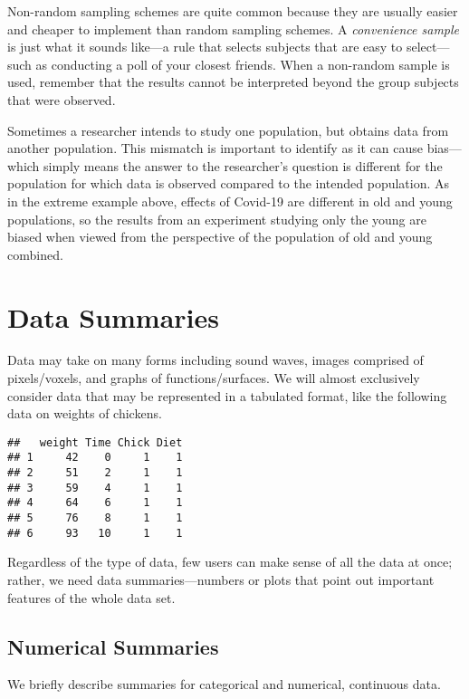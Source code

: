 \documentclass[
]{book}
\theoremstyle{definition}
\theoremstyle{definition}
\theoremstyle{definition}
\theoremstyle{definition}
\theoremstyle{remark}
\begin{document}
Non-random sampling schemes are quite common because they are usually easier and cheaper to implement than random sampling schemes. A \emph{convenience sample} is just what it sounds like---a rule that selects subjects that are easy to select---such as conducting a poll of your closest friends. When a non-random sample is used, remember that the results cannot be interpreted beyond the group subjects that were observed.

Sometimes a researcher intends to study one population, but obtains data from another population. This mismatch is important to identify as it can cause bias---which simply means the answer to the researcher's question is different for the population for which data is observed compared to the intended population. As in the extreme example above, effects of Covid-19 are different in old and young populations, so the results from an experiment studying only the young are biased when viewed from the perspective of the population of old and young combined.

\hypertarget{data-summaries}{%
\section{Data Summaries}\label{data-summaries}}

Data may take on many forms including sound waves, images comprised of pixels/voxels, and graphs of functions/surfaces. We will almost exclusively consider data that may be represented in a tabulated format, like the following data on weights of chickens.

\begin{verbatim}
##   weight Time Chick Diet
## 1     42    0     1    1
## 2     51    2     1    1
## 3     59    4     1    1
## 4     64    6     1    1
## 5     76    8     1    1
## 6     93   10     1    1
\end{verbatim}

Regardless of the type of data, few users can make sense of all the data at once; rather, we need data summaries---numbers or plots that point out important features of the whole data set.

\hypertarget{numerical-summaries}{%
\subsection{Numerical Summaries}\label{numerical-summaries}}

We briefly describe summaries for categorical and numerical, continuous data.
\end{document}
